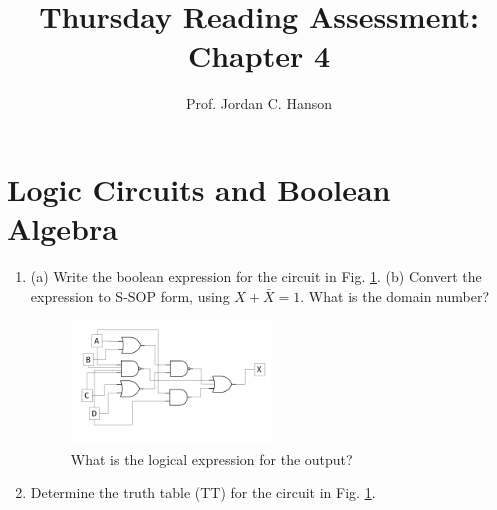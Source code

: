 \documentclass{article}
\begin{document}
\title{Thursday Reading Assessment: Chapter 4}
\author{Prof. Jordan C. Hanson}

\maketitle

\section{Logic Circuits and Boolean Algebra}

\begin{enumerate}
\item (a) Write the boolean expression for the circuit in Fig. \ref{fig:gates1}.  (b) Convert the expression to S-SOP form, using $X+\bar{X} = 1$.  What is the domain number? \\ \vspace{2cm}
\begin{figure}[ht]
\centering
\includegraphics[width=0.5\textwidth]{figures/MultiGate1.pdf}
\caption{\label{fig:gates1} What is the logical expression for the output?}
\end{figure}
\item Determine the truth table (TT) for the circuit in Fig. \ref{fig:gates1}.
\end{enumerate}
\end{document}
